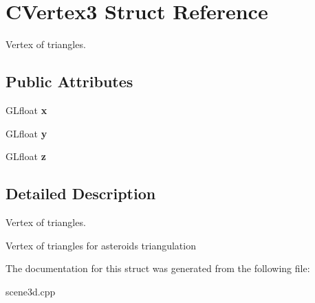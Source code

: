 \hypertarget{struct_c_vertex3}{}\section{C\+Vertex3 Struct Reference}
\label{struct_c_vertex3}


Vertex of triangles.  


\subsection*{Public Attributes}
\begin{DoxyCompactItemize}
\item 
\mbox{\label{struct_c_vertex3_a6d06f6ea215098297050897c72077764}} 
G\+Lfloat {\bfseries x}
\item 
\mbox{\label{struct_c_vertex3_a32e7e1e320aeac23f36c0dcb77888ecc}} 
G\+Lfloat {\bfseries y}
\item 
\mbox{\label{struct_c_vertex3_a58ab5b1a51e875e3b5ba01215f9d9d12}} 
G\+Lfloat {\bfseries z}
\end{DoxyCompactItemize}


\subsection{Detailed Description}
Vertex of triangles. 

Vertex of triangles for asteroid\textquotesingle{}s triangulation 

The documentation for this struct was generated from the following file\+:\begin{DoxyCompactItemize}
\item 
scene3d.\+cpp\end{DoxyCompactItemize}
